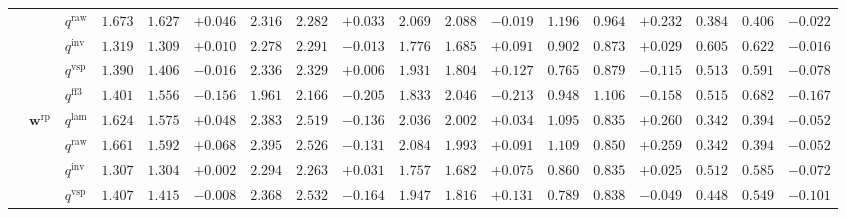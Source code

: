 \documentclass[eng]{kjas3}
\begin{document}
\begin{table}[t]
{\begin{tabular}{lll ccc ccc ccc ccc ccc}
 &  & $q^{\mathrm{raw}}$ & $1.673$ & $1.627$ & \cellcolor{posgreen!50}$+0.046$ & $2.316$ & $2.282$ & \cellcolor{posgreen!50}$+0.033$ & $2.069$ & $2.088$ & \cellcolor{negred!50}$-0.019$ & $1.196$ & $0.964$ & \cellcolor{posgreen!50}$+0.232$ & $0.384$ & $0.406$ & \cellcolor{negred!50}$-0.022$ \\
 &  & $q^{\mathrm{inv}}$ & $1.319$ & $1.309$ & \cellcolor{posgreen!50}$+0.010$ & $2.278$ & $2.291$ & \cellcolor{negred!50}$-0.013$ & $1.776$ & $1.685$ & \cellcolor{posgreen!50}$+0.091$ & $0.902$ & $0.873$ & \cellcolor{posgreen!50}$+0.029$ & $0.605$ & $0.622$ & \cellcolor{negred!50}$-0.016$ \\
 &  & $q^{\mathrm{vsp}}$ & $1.390$ & $1.406$ & \cellcolor{negred!50}$-0.016$ & $2.336$ & $2.329$ & \cellcolor{posgreen!50}$+0.006$ & $1.931$ & $1.804$ & \cellcolor{posgreen!50}$+0.127$ & $0.765$ & $0.879$ & \cellcolor{negred!50}$-0.115$ & $0.513$ & $0.591$ & \cellcolor{negred!50}$-0.078$ \\
 &  & $q^{\mathrm{ff3}}$ & $1.401$ & $1.556$ & \cellcolor{negred!50}$-0.156$ & $1.961$ & $2.166$ & \cellcolor{negred!50}$-0.205$ & $1.833$ & $2.046$ & \cellcolor{negred!50}$-0.213$ & $0.948$ & $1.106$ & \cellcolor{negred!50}$-0.158$ & $0.515$ & $0.682$ & \cellcolor{negred!50}$-0.167$ \\
\cmidrule(lr){2-18}
 & $\mathbf{w}^{\mathrm{rp}}$ & $q^{\mathrm{lam}}$ & $1.624$ & $1.575$ & \cellcolor{posgreen!50}$+0.048$ & $2.383$ & $2.519$ & \cellcolor{negred!50}$-0.136$ & $2.036$ & $2.002$ & \cellcolor{posgreen!50}$+0.034$ & $1.095$ & $0.835$ & \cellcolor{posgreen!50}$+0.260$ & $0.342$ & $0.394$ & \cellcolor{negred!50}$-0.052$ \\
 &  & $q^{\mathrm{raw}}$ & $1.661$ & $1.592$ & \cellcolor{posgreen!50}$+0.068$ & $2.395$ & $2.526$ & \cellcolor{negred!50}$-0.131$ & $2.084$ & $1.993$ & \cellcolor{posgreen!50}$+0.091$ & $1.109$ & $0.850$ & \cellcolor{posgreen!50}$+0.259$ & $0.342$ & $0.394$ & \cellcolor{negred!50}$-0.052$ \\
 &  & $q^{\mathrm{inv}}$ & $1.307$ & $1.304$ & \cellcolor{posgreen!50}$+0.002$ & $2.294$ & $2.263$ & \cellcolor{posgreen!50}$+0.031$ & $1.757$ & $1.682$ & \cellcolor{posgreen!50}$+0.075$ & $0.860$ & $0.835$ & \cellcolor{posgreen!50}$+0.025$ & $0.512$ & $0.585$ & \cellcolor{negred!50}$-0.072$ \\
 &  & $q^{\mathrm{vsp}}$ & $1.407$ & $1.415$ & \cellcolor{negred!50}$-0.008$ & $2.368$ & $2.532$ & \cellcolor{negred!50}$-0.164$ & $1.947$ & $1.816$ & \cellcolor{posgreen!50}$+0.131$ & $0.789$ & $0.838$ & \cellcolor{negred!50}$-0.049$ & $0.448$ & $0.549$ & \cellcolor{negred!50}$-0.101$ \\

\end{tabular}}
\end{table}
\end{document}

